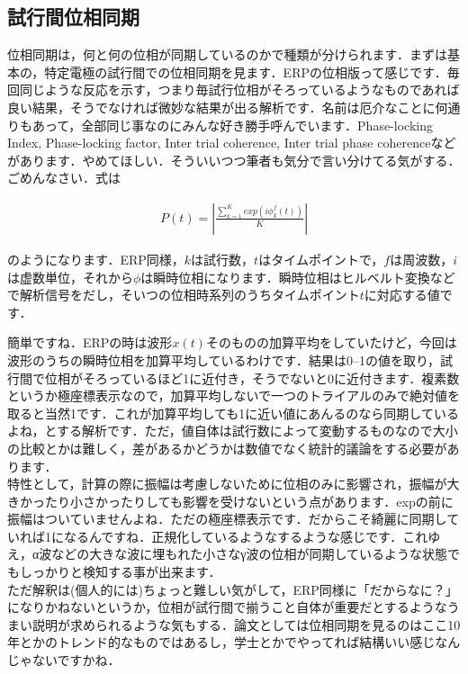 \documentclass[11pt,a4paper]{ujreport} 	%
\begin{document}
\subsection{試行間位相同期}
位相同期は，何と何の位相が同期しているのかで種類が分けられます．まずは基本の，特定電極の試行間での位相同期を見ます．ERPの位相版って感じです．毎回同じような反応を示す，つまり毎試行位相がそろっているようなものであれば良い結果，そうでなければ微妙な結果が出る解析です．名前は厄介なことに何通りもあって，全部同じ事なのにみんな好き勝手呼んでいます．Phase-locking Index, Phase-locking factor, Inter trial coherence, Inter trial phase coherenceなどがあります．やめてほしい．そういいつつ筆者も気分で言い分けてる気がする．ごめんなさい．式は

\begin{eqnarray}
  \label{eq:pli}
  P(t) = |\frac{\sum_{k=1}^K exp(i \phi_k^f(t))}{K}|
\end{eqnarray}

のようになります．ERP同様，$k$は試行数，$t$はタイムポイントで，$f$は周波数，$i$は虚数単位，それから$\phi$は瞬時位相になります．瞬時位相はヒルベルト変換などで解析信号をだし，そいつの位相時系列のうちタイムポイント$t$に対応する値です．

簡単ですね．ERPの時は波形$x(t)$そのものの加算平均をしていたけど，今回は波形のうちの瞬時位相を加算平均しているわけです．結果は0--1の値を取り，試行間で位相がそろっているほど1に近付き，そうでないと0に近付きます．複素数というか極座標表示なので，加算平均しないで一つのトライアルのみで絶対値を取ると当然1です．これが加算平均しても1に近い値にあんるのなら同期しているよね，とする解析です．ただ，値自体は試行数によって変動するものなので大小の比較とかは難しく，差があるかどうかは数値でなく統計的議論をする必要があります．\\

特性として，計算の際に振幅は考慮しないために位相のみに影響され，振幅が大きかったり小さかったりしても影響を受けないという点があります．expの前に振幅はついていませんよね．ただの極座標表示です．だからこそ綺麗に同期していれば1になるんですね．正規化しているようなするような感じです．これゆえ，α波などの大きな波に埋もれた小さなγ波の位相が同期しているような状態でもしっかりと検知する事が出来ます．\\

ただ解釈は(個人的には)ちょっと難しい気がして，ERP同様に「だからなに？」になりかねないというか，位相が試行間で揃うこと自体が重要だとするようなうまい説明が求められるような気もする．論文としては位相同期を見るのはここ10年とかのトレンド的なものではあるし，学士とかでやってれば結構いい感じなんじゃないですかね．
\end{document}
